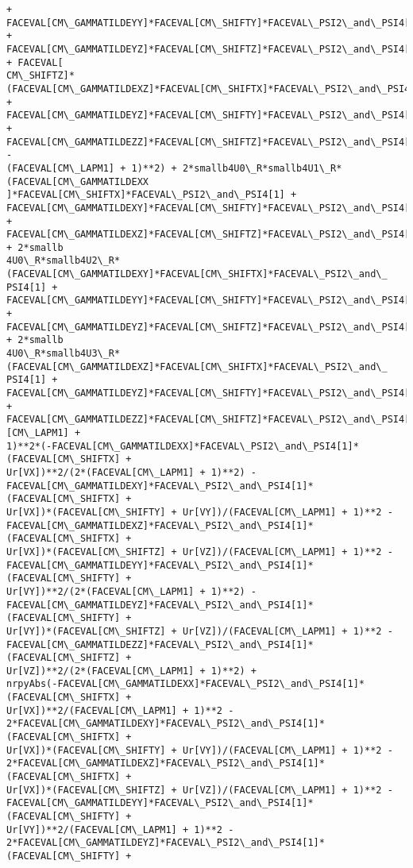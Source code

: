 \documentclass[landscape,letterpaper,10pt,english]{article}
\begin{document}
\begin{Verbatim}[commandchars=\\\{\}]
+ FACEVAL[CM\_GAMMATILDEYY]*FACEVAL[CM\_SHIFTY]*FACEVAL\_PSI2\_and\_PSI4[1] +
FACEVAL[CM\_GAMMATILDEYZ]*FACEVAL[CM\_SHIFTZ]*FACEVAL\_PSI2\_and\_PSI4[1]) + FACEVAL[
CM\_SHIFTZ]*(FACEVAL[CM\_GAMMATILDEXZ]*FACEVAL[CM\_SHIFTX]*FACEVAL\_PSI2\_and\_PSI4[1]
+ FACEVAL[CM\_GAMMATILDEYZ]*FACEVAL[CM\_SHIFTY]*FACEVAL\_PSI2\_and\_PSI4[1] +
FACEVAL[CM\_GAMMATILDEZZ]*FACEVAL[CM\_SHIFTZ]*FACEVAL\_PSI2\_and\_PSI4[1]) -
(FACEVAL[CM\_LAPM1] + 1)**2) + 2*smallb4U0\_R*smallb4U1\_R*(FACEVAL[CM\_GAMMATILDEXX
]*FACEVAL[CM\_SHIFTX]*FACEVAL\_PSI2\_and\_PSI4[1] +
FACEVAL[CM\_GAMMATILDEXY]*FACEVAL[CM\_SHIFTY]*FACEVAL\_PSI2\_and\_PSI4[1] +
FACEVAL[CM\_GAMMATILDEXZ]*FACEVAL[CM\_SHIFTZ]*FACEVAL\_PSI2\_and\_PSI4[1]) + 2*smallb
4U0\_R*smallb4U2\_R*(FACEVAL[CM\_GAMMATILDEXY]*FACEVAL[CM\_SHIFTX]*FACEVAL\_PSI2\_and\_
PSI4[1] + FACEVAL[CM\_GAMMATILDEYY]*FACEVAL[CM\_SHIFTY]*FACEVAL\_PSI2\_and\_PSI4[1] +
FACEVAL[CM\_GAMMATILDEYZ]*FACEVAL[CM\_SHIFTZ]*FACEVAL\_PSI2\_and\_PSI4[1]) + 2*smallb
4U0\_R*smallb4U3\_R*(FACEVAL[CM\_GAMMATILDEXZ]*FACEVAL[CM\_SHIFTX]*FACEVAL\_PSI2\_and\_
PSI4[1] + FACEVAL[CM\_GAMMATILDEYZ]*FACEVAL[CM\_SHIFTY]*FACEVAL\_PSI2\_and\_PSI4[1] +
FACEVAL[CM\_GAMMATILDEZZ]*FACEVAL[CM\_SHIFTZ]*FACEVAL\_PSI2\_and\_PSI4[1]))/((FACEVAL
[CM\_LAPM1] +
1)**2*(-FACEVAL[CM\_GAMMATILDEXX]*FACEVAL\_PSI2\_and\_PSI4[1]*(FACEVAL[CM\_SHIFTX] +
Ur[VX])**2/(2*(FACEVAL[CM\_LAPM1] + 1)**2) -
FACEVAL[CM\_GAMMATILDEXY]*FACEVAL\_PSI2\_and\_PSI4[1]*(FACEVAL[CM\_SHIFTX] +
Ur[VX])*(FACEVAL[CM\_SHIFTY] + Ur[VY])/(FACEVAL[CM\_LAPM1] + 1)**2 -
FACEVAL[CM\_GAMMATILDEXZ]*FACEVAL\_PSI2\_and\_PSI4[1]*(FACEVAL[CM\_SHIFTX] +
Ur[VX])*(FACEVAL[CM\_SHIFTZ] + Ur[VZ])/(FACEVAL[CM\_LAPM1] + 1)**2 -
FACEVAL[CM\_GAMMATILDEYY]*FACEVAL\_PSI2\_and\_PSI4[1]*(FACEVAL[CM\_SHIFTY] +
Ur[VY])**2/(2*(FACEVAL[CM\_LAPM1] + 1)**2) -
FACEVAL[CM\_GAMMATILDEYZ]*FACEVAL\_PSI2\_and\_PSI4[1]*(FACEVAL[CM\_SHIFTY] +
Ur[VY])*(FACEVAL[CM\_SHIFTZ] + Ur[VZ])/(FACEVAL[CM\_LAPM1] + 1)**2 -
FACEVAL[CM\_GAMMATILDEZZ]*FACEVAL\_PSI2\_and\_PSI4[1]*(FACEVAL[CM\_SHIFTZ] +
Ur[VZ])**2/(2*(FACEVAL[CM\_LAPM1] + 1)**2) +
nrpyAbs(-FACEVAL[CM\_GAMMATILDEXX]*FACEVAL\_PSI2\_and\_PSI4[1]*(FACEVAL[CM\_SHIFTX] +
Ur[VX])**2/(FACEVAL[CM\_LAPM1] + 1)**2 -
2*FACEVAL[CM\_GAMMATILDEXY]*FACEVAL\_PSI2\_and\_PSI4[1]*(FACEVAL[CM\_SHIFTX] +
Ur[VX])*(FACEVAL[CM\_SHIFTY] + Ur[VY])/(FACEVAL[CM\_LAPM1] + 1)**2 -
2*FACEVAL[CM\_GAMMATILDEXZ]*FACEVAL\_PSI2\_and\_PSI4[1]*(FACEVAL[CM\_SHIFTX] +
Ur[VX])*(FACEVAL[CM\_SHIFTZ] + Ur[VZ])/(FACEVAL[CM\_LAPM1] + 1)**2 -
FACEVAL[CM\_GAMMATILDEYY]*FACEVAL\_PSI2\_and\_PSI4[1]*(FACEVAL[CM\_SHIFTY] +
Ur[VY])**2/(FACEVAL[CM\_LAPM1] + 1)**2 -
2*FACEVAL[CM\_GAMMATILDEYZ]*FACEVAL\_PSI2\_and\_PSI4[1]*(FACEVAL[CM\_SHIFTY] +

\end{Verbatim}
\end{document}
